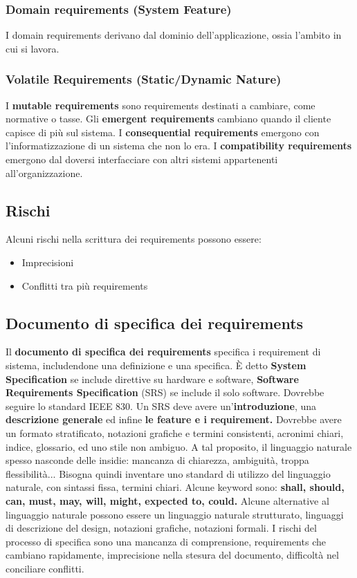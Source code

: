 \documentclass[11pt]{article}
\begin{document}
\subsubsection{Domain requirements (System Feature)}
I \gls{domain} requirements derivano dal dominio dell'applicazione, ossia l'ambito in cui si lavora. 
\subsubsection{Volatile Requirements (Static/Dynamic Nature)}
I \textbf{mutable requirements} sono requirements destinati a cambiare, come normative o tasse. Gli \textbf{emergent requirements} cambiano quando il cliente capisce di più sul sistema. I \textbf{consequential requirements} emergono con l'informatizzazione di un sistema che non lo era. I \textbf{compatibility requirements} emergono dal doversi interfacciare con altri sistemi appartenenti all'organizzazione. 
\subsection{Rischi}
Alcuni rischi nella scrittura dei requirements possono essere:
\begin{itemize}
    \item Imprecisioni
    \item Conflitti tra più requirements
\end{itemize}
\subsection{Documento di specifica dei requirements}
Il \textbf{documento di specifica dei requirements} specifica i requirement di sistema, includendone una definizione e una specifica. È detto \textbf{System Specification} se include direttive su hardware e software, \textbf{Software Requirements Specification} (SRS) se include il solo software. Dovrebbe seguire lo standard IEEE 830. Un SRS deve avere un'\textbf{introduzione}, una \textbf{descrizione generale} ed infine \textbf{le feature e i requirement.} Dovrebbe avere un formato stratificato, notazioni grafiche e termini consistenti, acronimi chiari, indice, glossario, ed uno stile non ambiguo. A tal proposito, il linguaggio naturale spesso nasconde delle insidie: mancanza di chiarezza, ambiguità, troppa flessibilità... Bisogna quindi inventare uno standard di utilizzo del linguaggio naturale, con sintassi fissa, termini chiari. Alcune keyword sono: \textbf{shall, should, can, must, may, will, might, expected to, could.} Alcune alternative al linguaggio naturale possono essere un linguaggio naturale strutturato, linguaggi di descrizione del design, notazioni grafiche, notazioni formali. I rischi del processo di specifica sono una mancanza di comprensione, requirements che cambiano rapidamente, imprecisione nella stesura del documento, difficoltà nel conciliare conflitti. 
\end{document}
